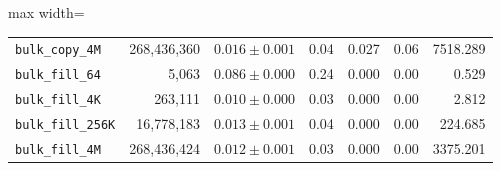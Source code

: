 \begin{table}[t]
\begin{adjustbox}{max width=\textwidth}
\begin{tabular}{lrrrrrr}
\texttt{bulk\_copy\_4M} & 268,436,360 & $0.016 \pm 0.001$ & 0.04 & 0.027 & 0.06 & 7518.289 \\
\texttt{bulk\_fill\_64} & 5,063 & $0.086 \pm 0.000$ & 0.24 & 0.000 & 0.00 & 0.529 \\
\texttt{bulk\_fill\_4K} & 263,111 & $0.010 \pm 0.000$ & 0.03 & 0.000 & 0.00 & 2.812 \\
\texttt{bulk\_fill\_256K} & 16,778,183 & $0.013 \pm 0.001$ & 0.04 & 0.000 & 0.00 & 224.685 \\
\texttt{bulk\_fill\_4M} & 268,436,424 & $0.012 \pm 0.001$ & 0.03 & 0.000 & 0.00 & 3375.201 \\
\bottomrule
\end{tabular}%
\end{adjustbox}
\end{table}
